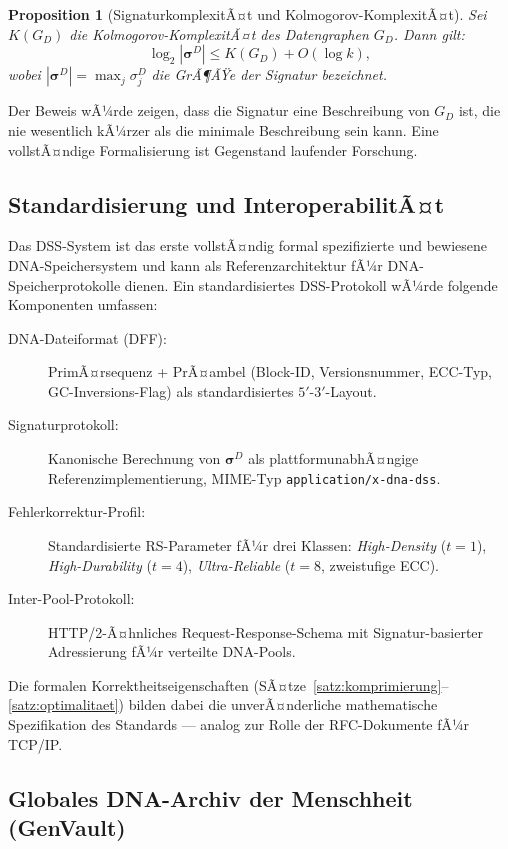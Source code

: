 ﻿\documentclass[a4paper,12pt]{article}
\theoremstyle{definition}
\theoremstyle{plain}
\newtheorem{proposition}{Proposition}[section]
\begin{document}
\begin{proposition}[SignaturkomplexitÃ¤t und Kolmogorov-KomplexitÃ¤t]
\label{prop:kolmogorov}
  Sei $K(G_D)$ die Kolmogorov-KomplexitÃ¤t des Datengraphen $G_D$.
  Dann gilt:
  \[
    \log_2 |\boldsymbol{\sigma}^D| \le K(G_D) + O(\log k),
  \]
  wobei $|\boldsymbol{\sigma}^D| = \max_j \sigma_j^D$ die GrÃ¶ÃŸe der
  Signatur bezeichnet.
\end{proposition}

Der Beweis wÃ¼rde zeigen, dass die Signatur eine Beschreibung von $G_D$
ist, die nie wesentlich kÃ¼rzer als die minimale Beschreibung sein kann.
Eine vollstÃ¤ndige Formalisierung ist Gegenstand laufender Forschung.

\subsection{Standardisierung und InteroperabilitÃ¤t}
\label{ssec:standardisierung}

Das DSS-System ist das erste vollstÃ¤ndig formal spezifizierte und bewiesene
DNA-Speicher\-system und kann als Referenzarchitektur fÃ¼r DNA-Speicherprotokolle
dienen.  Ein standardisiertes DSS-Protokoll wÃ¼rde folgende Komponenten
umfassen:

\begin{description}
  \item[DNA-Dateiformat (DFF):] PrimÃ¤rsequenz + PrÃ¤ambel (Block-ID,
        Versionsnummer, ECC-Typ, GC-Inversions-Flag) als standardisiertes
        $5'$-$3'$-Layout.
  \item[Signaturprotokoll:] Kanonische Berechnung von $\boldsymbol{\sigma}^D$
        als plattformunabhÃ¤ngige Referenzimplementierung, MIME-Typ
        \texttt{application/x-dna-dss}.
  \item[Fehlerkorrektur-Profil:] Standardisierte RS-Parameter fÃ¼r drei
        Klassen: \emph{High-Density} ($t=1$), \emph{High-Durability} ($t=4$),
        \emph{Ultra-Reliable} ($t=8$, zweistufige ECC).
  \item[Inter-Pool-Protokoll:] HTTP/2-Ã¤hnliches Request-Response-Schema
        mit Signatur-basier\-ter Adressierung fÃ¼r verteilte DNA-Pools.
\end{description}

Die formalen Korrektheitseigenschaften (SÃ¤tze~\ref{satz:komprimierung}--\ref{satz:optimalitaet})
bilden dabei die unverÃ¤nderliche mathematische Spezifikation des Standards
--- analog zur Rolle der RFC-Dokumente fÃ¼r TCP/IP.

\subsection{Globales DNA-Archiv der Menschheit (GenVault)}
\label{ssec:genvault}
\end{document}
